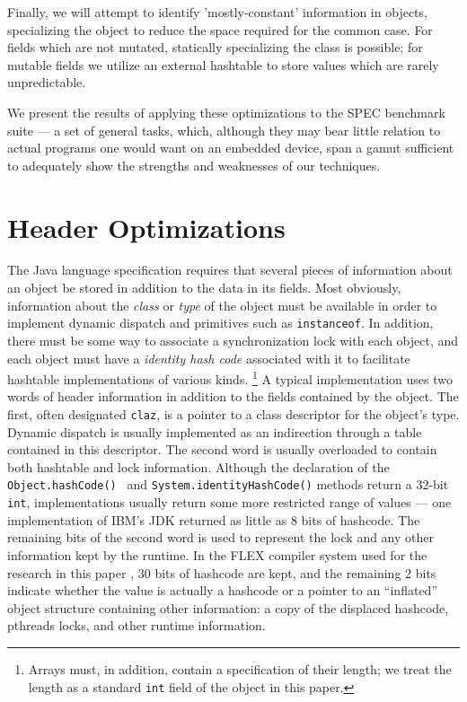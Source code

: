 \documentclass[preprint]{acmconf}
\begin{document}
Finally, we will attempt to identify 'mostly-constant' information in
objects, specializing the object to reduce the space required for
the common case.  For fields which are not mutated, statically
specializing the class is possible; for mutable fields we utilize an
external hashtable to store values which are rarely unpredictable.

We present the results of applying these optimizations to the SPEC
benchmark suite --- a set of general tasks, which, although they may bear
little relation to actual programs one would want on an embedded
device, span a gamut sufficient to adequately show the strengths and
weaknesses of our techniques.


\section{Header Optimizations}

The Java language specification requires that several pieces of
information about an object be stored in addition to the data in its
fields.  Most obviously, information about the {\it class} or {\it
  type} of the object must be available in order to implement dynamic
dispatch and primitives such as {\tt instanceof}.  In addition, there
must be some way to associate a synchronization lock with each object,
and each object must have a {\it identity hash code} associated with
it to facilitate hashtable implementations of various kinds.%
\footnote{Arrays must, in addition, contain a specification of their
  length; we treat the length as a standard {\tt int} field of the
  object in this paper.}
A typical implementation uses two words of header information in
addition to the fields contained by the object.  The first, often
designated {\tt claz}, is a pointer to a class descriptor for the
object's type.  Dynamic dispatch is usually implemented as an
indirection through a table contained in this descriptor.
The second word is usually overloaded to contain both hashtable and
lock information.  Although the declaration of the {\tt
  Object.hashCode() } and {\tt System.identityHashCode()} methods
return a 32-bit {\tt int}, implementations usually return some
more restricted range of values --- one implementation of IBM's JDK
\cite{bacon98}
returned as little as 8 bits of hashcode.  The remaining bits of the
second word is used to represent the lock and any other information
kept by the runtime.  In the FLEX compiler system used for the
research in this paper \cite{flexweb}, 30 bits of hashcode are kept, and the
remaining 2 bits indicate whether the value is actually a hashcode or
a pointer to an ``inflated'' object structure containing other
information: a copy of the displaced hashcode, pthreads locks,
and other runtime information.
\end{document}
